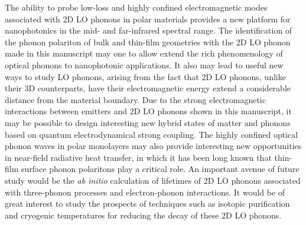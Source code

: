 \documentclass[aps,prb,twocolumn,
	groupedaddress,superscriptaddress,
	amsfonts,amssymb,amsmath,floatfix,
	citeautoscript]{revtex4-1}
\begin{document}
The ability to probe low-loss and highly confined electromagnetic modes associated with 2D LO phonons in polar materials provides a new platform for nanophotonics in the mid- and far-infrared spectral range. The identification of the phonon polariton of bulk and thin-film geometries with the 2D LO phonon made in this manuscript may one to allow extend the rich phenomenology of optical phonons to nanophotonic applications. It also may lead to useful new ways to study LO phonons, arising from the fact that 2D LO phonons, unlike their 3D counterparts, have their electromagnetic energy extend a considerable distance from the material boundary. Due to the strong electromagnetic interactions between emitters and 2D LO phonons shown in this manuscript, it may be possible to design interesting new hybrid states of matter and phonons based on quantum electrodynamical strong coupling. The highly confined optical phonon waves in polar monolayers may also provide interesting new opportunities in near-field radiative heat transfer, in which it has been long known that thin-film surface phonon polaritons play a critical role. An important avenue of future study would be the \textit{ab initio} calculation of lifetimes of 2D LO phonons associated with three-phonon processes and electron-phonon interactions. It would be of great interest to study the prospects of techniques such as isotopic purification and cryogenic temperatures for reducing the decay of these 2D LO phonons.
\end{document}

